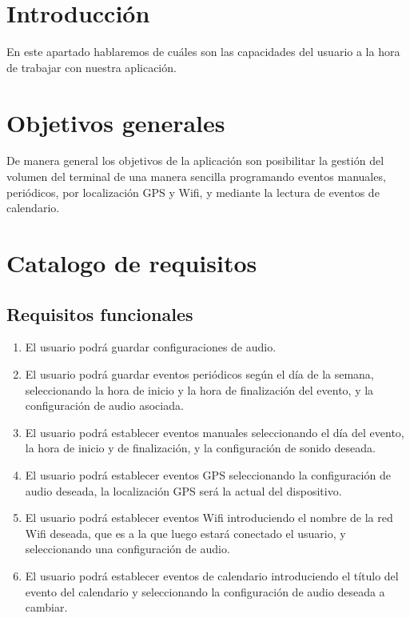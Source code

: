
\section{Introducción}
En este apartado hablaremos de cuáles son las capacidades del usuario a la hora de trabajar con nuestra aplicación.

\section{Objetivos generales}
De manera general los objetivos de la aplicación son posibilitar la gestión del volumen del terminal de una manera sencilla programando eventos manuales, periódicos, por localización GPS y Wifi, y mediante la lectura de eventos de calendario.

\section{Catalogo de requisitos}
\subsection{Requisitos funcionales}
\begin{enumerate}
	\item El usuario podrá guardar configuraciones de audio.
	\item El usuario podrá guardar eventos periódicos según el día de la semana, seleccionando la hora de inicio y la hora de finalización del evento, y la configuración de audio asociada.
	\item El usuario podrá establecer eventos manuales seleccionando el día del evento, la hora de inicio y de finalización, y la configuración de sonido deseada.
	\item El usuario podrá establecer eventos GPS seleccionando la configuración de audio deseada, la localización GPS será la actual del dispositivo.
	\item El usuario podrá establecer eventos Wifi introduciendo el nombre de la red Wifi deseada, que es a la que luego estará conectado el usuario, y seleccionando una configuración de audio.
	\item El usuario podrá establecer eventos de calendario introduciendo el título del evento del calendario y seleccionando la configuración de audio deseada a cambiar.

\end{enumerate}

